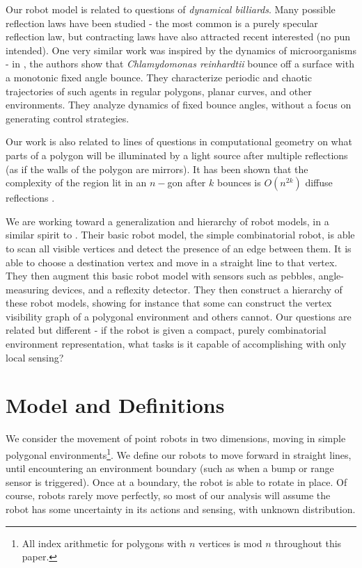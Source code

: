 \documentclass[]{styles/svproc}  %
\begin{document}
Our robot model is related to questions of \emph{dynamical billiards}. Many 
possible reflection laws have been studied -
the most common is a purely specular reflection law, but contracting laws have
also attracted recent interested \cite{DelMagno2014,billiards,pinball} (no pun intended). 
One very similar work was inspired by the dynamics of microorganisms - in \cite{microorganism2017}, 
the authors show that 
\textit{Chlamydomonas reinhardtii} bounce off a surface with a
monotonic fixed angle bounce. They characterize periodic and
chaotic trajectories of such agents in regular polygons, planar curves, and other environments.
They analyze dynamics of fixed bounce angles, without a focus on generating control
strategies.

Our work is also related to lines of questions in computational geometry on what
parts of a polygon will be illuminated by a light source after multiple
reflections (as if the walls of the polygon are mirrors). It has been shown that
the complexity of the region lit in an $n-$gon after $k$ bounces is $O(n^{2k})$
{\color{red} diffuse reflections} \cite{Aronov1996,prasad1998visibility}.

We are working toward a generalization and hierarchy of robot models, in a
similar spirit to \cite{brunner2008simple}. Their basic robot model, the simple
combinatorial robot, is able to scan all visible vertices and detect the
presence of an edge between them. It is able to choose a destination vertex and
move in a straight line to that vertex. They then augment this basic robot model
with sensors such as pebbles, angle-measuring devices, and a reflexity detector.
They then construct a hierarchy of these robot models, showing for instance that
some can construct the vertex visibility graph of a polygonal environment
and others cannot. Our questions are related but different - if the robot is
given a compact, purely combinatorial environment representation, what tasks is 
it capable of accomplishing with only local sensing?

\section{Model and Definitions}

We consider the movement of point robots in two dimensions, moving in simple 
polygonal environments\footnote{All index arithmetic for polygons with $n$ vertices is mod $n$ 
throughout this paper.}. We define our robots to move forward in straight lines, until
encountering an environment boundary (such as when a bump or range sensor is
triggered). Once at a boundary, the robot is able to rotate in place.
Of course, robots rarely move perfectly, so most of our analysis will assume the
robot has some uncertainty in its actions and sensing, with unknown
distribution.
\end{document}
